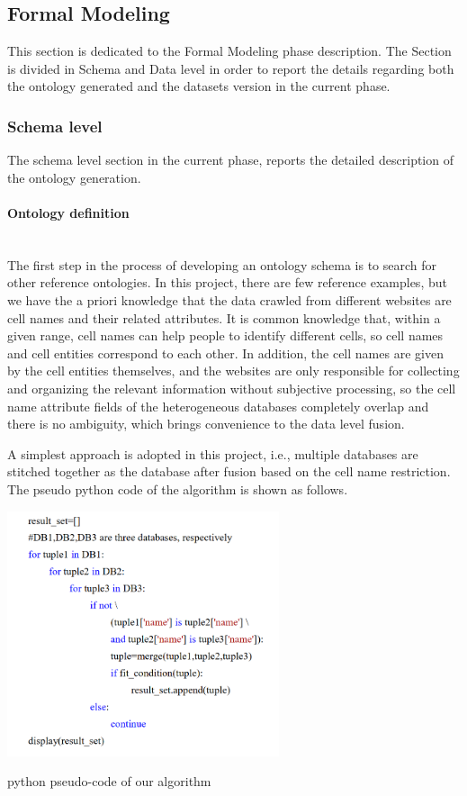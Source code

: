 \subsection{Formal Modeling}
This section is dedicated to the Formal Modeling phase description. The Section is divided in Schema and Data level in order to report the details regarding both the ontology generated and the datasets version in the current phase.

\subsubsection{Schema level}
The schema level section in the current phase, reports the detailed description of the ontology generation.

\paragraph{Ontology definition}\mbox{}\\
The first step in the process of developing an ontology schema is to search for other reference ontologies. In this project, there are few reference examples, but we have the a priori knowledge that the data crawled from different websites are cell names and their related attributes. It is common knowledge that, within a given range, cell names can help people to identify different cells, so cell names and cell entities correspond to each other. In addition, the cell names are given by the cell entities themselves, and the websites are only responsible for collecting and organizing the relevant information without subjective processing, so the cell name attribute fields of the heterogeneous databases completely overlap and there is no ambiguity, which brings convenience to the data level fusion.


A simplest approach is adopted in this project, i.e., multiple databases are stitched together as the database after fusion based on the cell name restriction. The pseudo python code of the algorithm is shown 
as follows.


\includegraphics[width=8cm]{student codebook/sections/figure.png}
    \caption{python pseudo-code of our algorithm}



